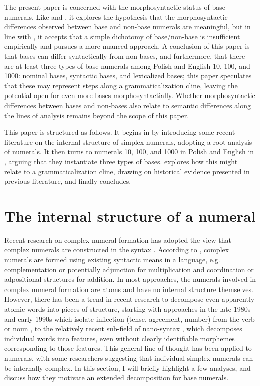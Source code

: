 \documentclass[output=paper]{langscibook}
\begin{document}
The present paper is concerned with the morphosyntactic status of base numerals. Like \citet{kayne2005bases} and \citet{rothstein2013fregean}, it explores the hypothesis that the morphosyntactic differences observed between base and non-base numerals are meaningful, but in line with \citet{i&m2018}, it accepts that a simple dichotomy of base/non-base is insufficient empirically and pursues a more nuanced approach. A conclusion of this paper is that bases can differ syntactically from non-bases, and furthermore, that there are at least three types of base numerals among Polish and English 10, 100, and 1000: nominal bases, syntactic bases, and lexicalized bases; this paper speculates that these may represent steps along a grammaticalization cline, leaving the potential open for even more bases morphosyntactially. Whether morphosyntactic differences between bases and non-bases also relate to semantic differences along the lines of  analysis remains beyond the scope of this paper.

This paper is structured as follows. It begins in  by introducing some recent literature on the internal structure of simplex numerals, adopting a root analysis of numerals. It then turns to numerals 10, 100, and 1000 in Polish and English in , arguing that they instantiate three types of bases.  explores how this might relate to a grammaticalization cline, drawing on historical evidence presented in previous literature, and finally  concludes.

\section{The internal structure of a numeral}\label{klo:numeralStructure}

Recent research on complex numeral formation has adopted the view that complex numerals are constructed in the syntax \citep[see especially][]{i&m2004,i&m2006, i&m2018}. According to \citet{i&m2018}, complex numerals are formed using existing syntactic means in a language, e.g. complementation or potentially adjunction for multiplication and coordination or adpositional structures for addition. In most approaches, the numerals involved in complex numeral formation are atoms and have no internal structure themselves. However, there has been a trend in recent research to decompose even apparently atomic words into pieces of structure, starting with approaches in the late 1980s and early 1990s which isolate inflection (tense, agreement, number) from the verb or noun \citep[e.g.][]{pollock1989infl, ritter1991nump}, to the relatively recent sub-field of nano-syntax \citep[e.g.][]{starke2010nanosyntax}, which decomposes individual words into features, even without clearly identifiable morphemes corresponding to those features. This general line of thought has been applied to numerals, with some researchers suggesting that individual simplex numerals can be internally complex. In this section, I will briefly highlight a few analyses, and discuss how they motivate an extended decomposition for base numerals.
\end{document}
